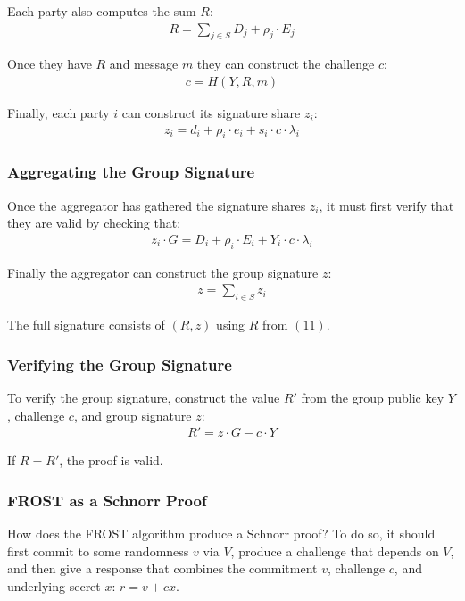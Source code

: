 \documentclass{article}
\theoremstyle{definition}
\theoremstyle{remark}
\begin{document}
Each party also computes the sum $R$:
\begin{align}
  R = \sum_{j \in S}^{} D_j + \rho_j \cdot E_j
\end{align}

Once they have $R$ and message $m$ they can construct the challenge $c$:
\begin{align}
  c = H(Y, R, m)
\end{align}

Finally, each party $i$ can construct its signature share $z_i$:
\begin{align}
  z_i = d_i + \rho_i \cdot e_i + s_i \cdot c \cdot \lambda_i
\end{align}

\subsubsection{
  Aggregating the Group Signature
}

Once the aggregator has gathered the signature shares $z_i$, it must first verify that they are valid by checking that:
\begin{align}
  z_i \cdot G = D_i + \rho_i \cdot E_i + Y_i \cdot c \cdot \lambda_i
\end{align}

Finally the aggregator can construct the group signature $z$:
\begin{align}
  z = \sum_{i \in S}^{} z_i
\end{align}

The full signature consists of $(R, z)$ using $R$ from $(11)$.

\subsubsection{
  Verifying the Group Signature
}

To verify the group signature, construct the value $R'$ from the group public key $Y$, challenge $c$, and group signature $z$:
\begin{align}
  R' = z \cdot G - c \cdot Y
\end{align}

If $R = R'$, the proof is valid.

\subsubsection{
  FROST as a Schnorr Proof
}

How does the FROST algorithm produce a Schnorr proof?  To do so, it should first commit to some randomness $v$ via $V$, produce a challenge that depends on $V$, and then give a response that combines the commitment $v$, challenge $c$, and underlying secret $x$: $r = v + cx$.
\end{document}
